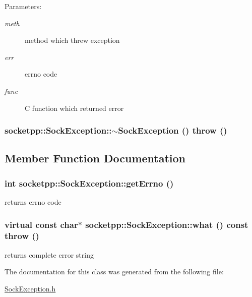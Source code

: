 \begin{Desc}
\item[Parameters:]
\begin{description}
\item[{\em meth}]method which threw exception \item[{\em err}]errno code \item[{\em func}]C function which returned error \end{description}
\end{Desc}
\hypertarget{classsocketpp_1_1SockException_5ab9299ca51c12d5d1a62d7872003b84}{
\subsubsection[{$\sim$SockException}]{\setlength{\rightskip}{0pt plus 5cm}socketpp::SockException::$\sim$SockException ()  throw ()}}
\label{classsocketpp_1_1SockException_5ab9299ca51c12d5d1a62d7872003b84}




\subsection{Member Function Documentation}
\hypertarget{classsocketpp_1_1SockException_cc8b24550b7a77c5f710a6abaff6e696}{
\subsubsection[{getErrno}]{\setlength{\rightskip}{0pt plus 5cm}int socketpp::SockException::getErrno ()}}
\label{classsocketpp_1_1SockException_cc8b24550b7a77c5f710a6abaff6e696}


returns errno code 

\hypertarget{classsocketpp_1_1SockException_5c15a1c818818042230d017d924ef9ea}{
\subsubsection[{what}]{\setlength{\rightskip}{0pt plus 5cm}virtual const char$\ast$ socketpp::SockException::what () const  throw ()}}
\label{classsocketpp_1_1SockException_5c15a1c818818042230d017d924ef9ea}


returns complete error string 



The documentation for this class was generated from the following file:\begin{CompactItemize}
\item 
\hyperlink{SockException_8h}{SockException.h}\end{CompactItemize}
